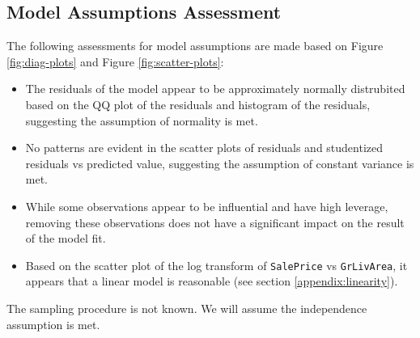 \documentclass[american,]{article}
\providecommand{\tightlist}{%
  \setlength{\itemsep}{0pt}\setlength{\parskip}{0pt}}
\begin{document}
\hypertarget{model-assumptions-assessment}{%
\subsection{Model Assumptions
Assessment}\label{model-assumptions-assessment}}

The following assessments for model assumptions are made based on Figure
\ref{fig:diag-plots} and Figure \ref{fig:scatter-plots}:

\begin{itemize}
\tightlist
\item
  The residuals of the model appear to be approximately normally
  distrubited based on the QQ plot of the residuals and histogram of the
  residuals, suggesting the assumption of normality is met.
\item
  No patterns are evident in the scatter plots of residuals and
  studentized residuals vs predicted value, suggesting the assumption of
  constant variance is met.
\item
  While some observations appear to be influential and have high
  leverage, removing these observations does not have a significant
  impact on the result of the model fit.
\item
  Based on the scatter plot of the log transform of \texttt{SalePrice}
  vs \texttt{GrLivArea}, it appears that a linear model is reasonable
  (see section \ref{appendix:linearity}).
\end{itemize}

The sampling procedure is not known. We will assume the independence
assumption is met.
\end{document}
